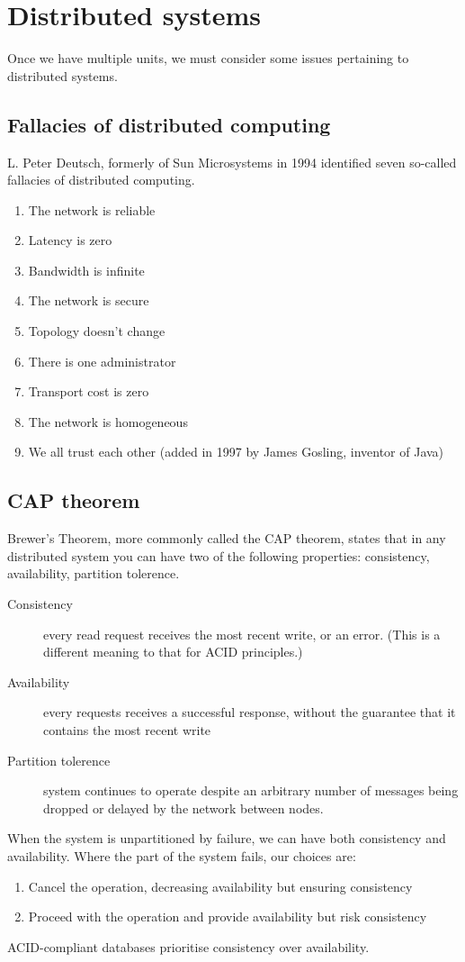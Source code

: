 \documentclass[slides]{pgnotes}
\begin{document}
\section{Distributed systems}

Once we have multiple units, we must consider some issues pertaining to distributed systems.

\subsection{Fallacies of distributed computing}

L. Peter Deutsch, formerly of Sun Microsystems in 1994 identified seven so-called fallacies of distributed computing.

\begin{enumerate}
\item The network is reliable
\item Latency is zero
\item Bandwidth is infinite
\item The network is secure
\item Topology doesn't change
\item There is one administrator
\item Transport cost is zero
\item The network is homogeneous
\item We all trust each other (added in 1997 by James Gosling, inventor of Java)
\end{enumerate}

\subsection{CAP theorem}

Brewer's Theorem, more commonly called the CAP theorem, states that in any distributed system you can have two of the following properties: consistency, availability, partition tolerence. 
\begin{description}
\item[Consistency] every read request receives the most recent write, or an error. (This is a different meaning to that for ACID principles.)
\item[Availability] every requests receives a successful response, without the guarantee that it contains the most recent write
\item[Partition tolerence] system continues to operate despite an arbitrary number of messages being dropped or delayed by the network between nodes. 
\end{description}
When the system is unpartitioned by failure, we can have both consistency and availability.
Where the part of the system fails, our choices are:
\begin{enumerate}
\item Cancel the operation, decreasing availability but ensuring consistency
\item Proceed with the operation and provide availability but risk consistency
\end{enumerate}
ACID-compliant databases prioritise consistency over availability.
\end{document}
